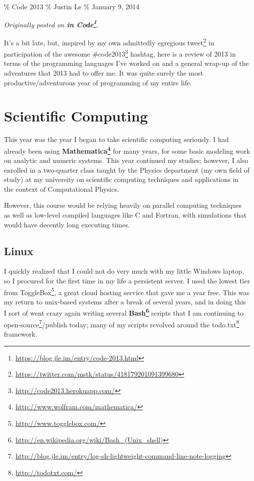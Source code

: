 \documentclass[]{article}
\renewcommand{\href}[2]{#2\footnote{\url{#1}}}
\begin{document}
\% Code 2013 \% Justin Le \% January 9, 2014

\emph{Originally posted on
\textbf{\href{https://blog.jle.im/entry/code-2013.html}{in Code}}.}

It's a bit late, but, inspired by my own admittedly egregious
\href{https://twitter.com/mstk/status/418179201091399680}{tweet} in
participation of the awesome \href{http://code2013.herokuapp.com/}{\#code2013}
hashtag, here is a review of 2013 in terms of the programming languages I've
worked on and a general wrap-up of the adventures that 2013 had to offer me. It
was quite surely the most productive/adventurous year of programming of my
entire life.

\section{Scientific Computing}

This year was the year I began to take scientific computing seriously. I had
already been using
\textbf{\href{http://www.wolfram.com/mathematica/}{Mathematica}} for many years,
for some basic modeling work on analytic and numeric systems. This year
continued my studies; however, I also enrolled in a two-quarter class taught by
the Physics department (my own field of study) at my university on scientific
computing techniques and applications in the context of Computational Physics.

However, this course would be relying heavily on parallel computing techniques
as well as low-level compiled languages like C and Fortran, with simulations
that would have decently long executing times.

\subsection{Linux}

I quickly realized that I could not do very much with my little Windows laptop,
so I procured for the first time in my life a persistent server. I used the
lowest tier from \href{http://www.togglebox.com/}{ToggleBox}, a great cloud
hosting service that gave me a year free. This was my return to unix-based
systems after a break of several years, and in doing this I sort of went crazy
again writing several
\textbf{\href{http://en.wikipedia.org/wiki/Bash_(Unix_shell)}{Bash}} scripts
that I am continuing to
\href{http://blog.jle.im/entry/log-sh-lightweight-command-line-note-logging}{open-source}/publish
today; many of my scripts revolved around the
\href{http://todotxt.com/}{todo.txt} framework.
\end{document}
